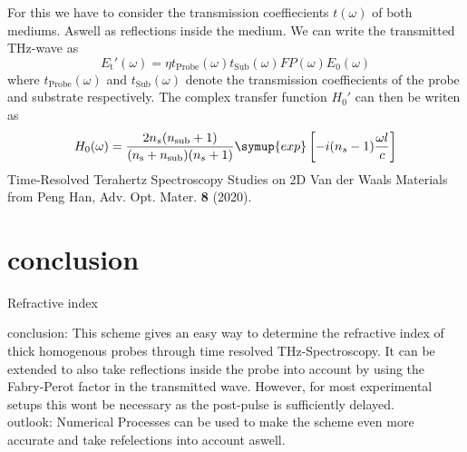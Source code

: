\documentclass[aspectratio=1610, 9pt]{beamer}
\begin{document}
\begin{frame}
  For this we have to consider the transmission coeffiecients $t(\omega)$ of both mediums.
  Aswell as reflections inside the medium.
  We can write the transmitted THz-wave as
  \begin{equation}
    E_\text{t} '(\omega) = \eta t_\text{Probe}(\omega) t_\text{Sub}(\omega)FP(\omega)E_0(\omega)
  \end{equation}
  where $t_\text{Probe}(\omega)$ and $t_\text{Sub}(\omega)$ denote the transmission coeffiecients of the probe and substrate respectively.
  The complex transfer function $H_0'$ can then be writen as 
  \begin{equation}
    H_0(\omega) = \frac{2 n_s(n_\text{sub} + 1)}{(n_\text{s} + n_\text{sub})(n_s + 1)} \symup{exp}\left[ - i (n_s - 1) \frac{\omega l }{c}\right]
  \end{equation}
  \textcolor{tugreen}{Time-Resolved Terahertz Spectroscopy Studies on 2D Van der Waals Materials} from Peng Han, Adv. Opt. Mater. \textbf{8} (2020).
\end{frame}

\section{conclusion}
\begin{frame}{Refractive index}
  \begin{center}
  \textcolor{tugreen}{conclusion:}
  This scheme gives an easy way to determine the refractive index of thick homogenous probes through time resolved THz-Spectroscopy.
  It can be extended to also take reflections inside the probe into account by using the Fabry-Perot factor in the transmitted wave.
  However, for most experimental setups this wont be necessary as the post-pulse is sufficiently delayed.\\
  \textcolor{tugreen}{outlook:}
  Numerical Processes can be used to make the scheme even more accurate and take refelections into account aswell.
\end{center}
\end{frame}
\end{document}
